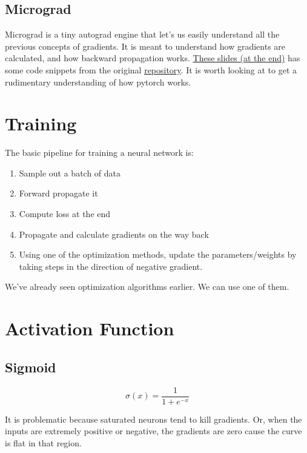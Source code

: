\subsection{Micrograd}

Micrograd is a tiny autograd engine that let's us easily understand all the previous concepts of gradients. It is meant to understand how gradients are calculated, and how backward propagation works. \href{https://github.com/RoboticsIIITH/summer-sessions-2020/blob/master/lecture-slides/deep_learning/vector_derivatives.pdf}{These slides (at the end)} has some code snippets from the original \href{https://github.com/karpathy/micrograd}{repository}. It is worth looking at to get a rudimentary understanding of how pytorch works.

\section{Training}

The basic pipeline for training a neural network is:

\begin{enumerate}
    \item Sample out a batch of data
    \item Forward propagate it
    \item Compute loss at the end
    \item Propagate and calculate gradients on the way back
    \item Using one of the optimization methods, update the parameters/weights by taking steps in the direction of negative gradient.
\end{enumerate}

We've already seen optimization algorithms earlier. We can use one of them.

\section{Activation Function}

\subsection{Sigmoid}

\begin{equation}
    \sigma(x)=\frac{1}{1+e^{-x}}
\end{equation}

It is problematic because saturated neurons tend to kill gradients. Or, when the inputs are extremely positive or negative, the gradients are zero cause the curve is flat in that region. 


